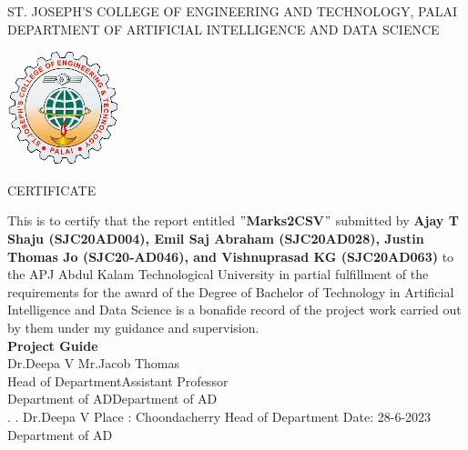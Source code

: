 \newpage
\thispagestyle{empty}
\begin{center}
\normalsize{ST. JOSEPH’S COLLEGE OF ENGINEERING AND TECHNOLOGY, PALAI}\\[0.5cm]
\normalsize
 { DEPARTMENT OF ARTIFICIAL INTELLIGENCE AND DATA SCIENCE}\\[1.0cm]%
   \begin{center}
   \includegraphics{Images/SJCET_logo.jpg}
   \end{center}
{\large CERTIFICATE}\\[1.5cm]
\end{center}
\normalsize 
This is to certify that the report entitled {\bf $"$Marks2CSV$"$} submitted by { \bf Ajay T Shaju (SJC20AD004), Emil Saj Abraham (SJC20AD028), Justin Thomas Jo (SJC20-AD046), and Vishnuprasad KG (SJC20AD063)} to the APJ Abdul Kalam Technological University in partial fulfillment of the requirements for the award of the Degree of Bachelor of Technology in Artificial Intelligence and Data Science is a bonafide record of the project work carried out by them under my guidance and supervision.\vspace{1.3 cm}\\
{\bf Project Guide}\hspace{8.4 cm}{\bf Project Coordinator}\\
Dr.Deepa V\hspace{9.0 cm} Mr.Jacob Thomas\\
Head of Department\hspace{7.6 cm}Assistant Professor\hspace{2.6 cm}\\Department of 
 AD\hspace{7.9 cm}Department of AD
\vspace{1.3 cm}\\
.\hspace{11.01 cm}{ \bf Head of Department}
\newline
.\hspace{11.01 cm} Dr.Deepa V
\newline
Place : Choondacherry  \hspace{6.87 cm} Head of Department
\newline
Date\hspace{0.25 cm}: 28-6-2023 \hspace{7.9 cm} Department of AD
                
